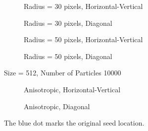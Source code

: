\documentclass[12pt]{article}
\begin{document}
\begin{figure}
  \centering
  \vspace{-15mm}
  \begin{subfigure}[b]{0.45\textwidth}
    \caption{Radius = 30 pixels, Horizontal-Vertical}
  \end{subfigure}
  \qquad
  \begin{subfigure}[b]{0.45\textwidth}
    \caption{Radius = 30 pixels, Diagonal}
  \end{subfigure}

  \begin{subfigure}[b]{0.45\textwidth}
    \caption{Radius = 50 pixels, Horizontal-Vertical}
  \end{subfigure}
  \qquad
  \begin{subfigure}[b]{0.45\textwidth}
    \caption{Radius = 50 pixels, Diagonal}
  \end{subfigure}

  \caption{Size = 512, Number of Particles 10000}
  \label{circ}
\end{figure}


\begin{figure}
  \centering
  \begin{subfigure}[b]{0.85\textwidth}
    \caption{Anisotropic, Horizontal-Vertical}
  \end{subfigure}

  \begin{subfigure}[b]{0.85\textwidth}
    \caption{Anisotropic, Diagonal}
  \end{subfigure}

  \caption{The blue dot marks the original seed location.}
  \label{top}
\end{figure}
\end{document}
